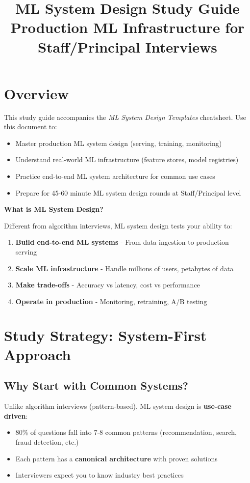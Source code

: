 \documentclass[10pt]{article}
\title{\textbf{ML System Design Study Guide} \\ \large Production ML Infrastructure for Staff/Principal Interviews}
\author{}
\date{}
\begin{document}
\maketitle

\section*{Overview}

This study guide accompanies the \textit{ML System Design Templates} cheatsheet. Use this document to:
\begin{itemize}
\item Master production ML system design (serving, training, monitoring)
\item Understand real-world ML infrastructure (feature stores, model registries)
\item Practice end-to-end ML system architecture for common use cases
\item Prepare for 45-60 minute ML system design rounds at Staff/Principal level
\end{itemize}

\textbf{What is ML System Design?}

Different from algorithm interviews, ML system design tests your ability to:
\begin{enumerate}
\item \textbf{Build end-to-end ML systems} - From data ingestion to production serving
\item \textbf{Scale ML infrastructure} - Handle millions of users, petabytes of data
\item \textbf{Make trade-offs} - Accuracy vs latency, cost vs performance
\item \textbf{Operate in production} - Monitoring, retraining, A/B testing
\end{enumerate}

\section{Study Strategy: System-First Approach}

\subsection{Why Start with Common Systems?}

Unlike algorithm interviews (pattern-based), ML system design is \textbf{use-case driven}:
\begin{itemize}
\item 80\% of questions fall into 7-8 common patterns (recommendation, search, fraud detection, etc.)
\item Each pattern has a \textbf{canonical architecture} with proven solutions
\item Interviewers expect you to know industry best practices
\end{itemize}
\end{document}
